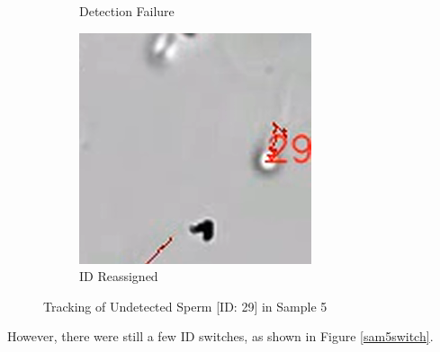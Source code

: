 \begin{figure}[h]
\begin{subfigure}[b]{0.3\textwidth}
         \caption{Detection Failure}
     \end{subfigure}
     \hfill
     \begin{subfigure}[b]{0.3\textwidth}
         \centering
         \includegraphics[width=\textwidth]{Images/sam5-6.png}
         \caption{ID Reassigned}
     \end{subfigure}
        \caption{Tracking of Undetected Sperm [ID: 29] in Sample 5}
        \label{sam5keep}
\end{figure}
\newpage
However, there were still a few ID switches, as shown in Figure \ref{sam5switch}.
